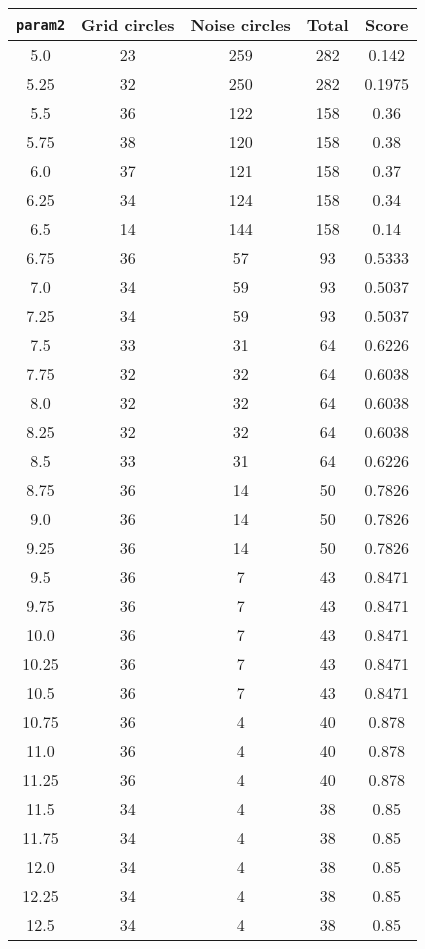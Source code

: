 \documentclass[letterpaper, 12pt]{article}
\begin{document}
\begin{longtable}{|c|c|c|c|c|}
\hline
\textbf{\texttt{param2}} & \textbf{Grid circles} & \textbf{Noise circles} & \textbf{Total} & \textbf{Score} \\
\hline
5.0 & 23 & 259 & 282 & 0.142 \\
\hline
5.25 & 32 & 250 & 282 & 0.1975 \\
\hline
5.5 & 36 & 122 & 158 & 0.36 \\
\hline
5.75 & 38 & 120 & 158 & 0.38 \\
\hline
6.0 & 37 & 121 & 158 & 0.37 \\
\hline
6.25 & 34 & 124 & 158 & 0.34 \\
\hline
6.5 & 14 & 144 & 158 & 0.14 \\
\hline
6.75 & 36 & 57 & 93 & 0.5333 \\
\hline
7.0 & 34 & 59 & 93 & 0.5037 \\
\hline
7.25 & 34 & 59 & 93 & 0.5037 \\
\hline
7.5 & 33 & 31 & 64 & 0.6226 \\
\hline
7.75 & 32 & 32 & 64 & 0.6038 \\
\hline
8.0 & 32 & 32 & 64 & 0.6038 \\
\hline
8.25 & 32 & 32 & 64 & 0.6038 \\
\hline
8.5 & 33 & 31 & 64 & 0.6226 \\
\hline
8.75 & 36 & 14 & 50 & 0.7826 \\
\hline
9.0 & 36 & 14 & 50 & 0.7826 \\
\hline
9.25 & 36 & 14 & 50 & 0.7826 \\
\hline
9.5 & 36 & 7 & 43 & 0.8471 \\
\hline
9.75 & 36 & 7 & 43 & 0.8471 \\
\hline
10.0 & 36 & 7 & 43 & 0.8471 \\
\hline
10.25 & 36 & 7 & 43 & 0.8471 \\
\hline
10.5 & 36 & 7 & 43 & 0.8471 \\
\hline
10.75 & 36 & 4 & 40 & 0.878 \\
\hline
11.0 & 36 & 4 & 40 & 0.878 \\
\hline
11.25 & 36 & 4 & 40 & 0.878 \\
\hline
11.5 & 34 & 4 & 38 & 0.85 \\
\hline
11.75 & 34 & 4 & 38 & 0.85 \\
\hline
12.0 & 34 & 4 & 38 & 0.85 \\
\hline
12.25 & 34 & 4 & 38 & 0.85 \\
\hline
12.5 & 34 & 4 & 38 & 0.85 \\

\end{longtable}
\end{document}
